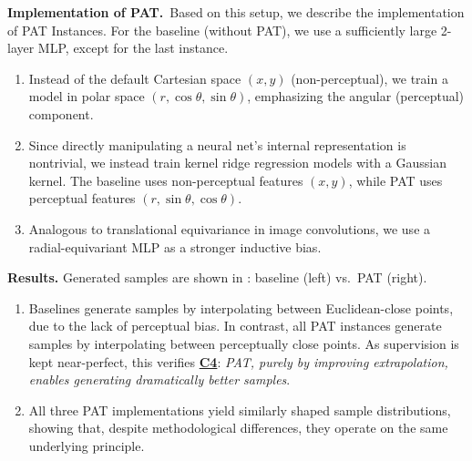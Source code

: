 \textbf{Implementation of PAT.}~Based on this setup, we describe the implementation of PAT Instances. For the baseline (without PAT), we use a sufficiently large 2-layer MLP, except for the last instance.
{\setlength{\parskip}{2pt}
\begin{enumerate}[leftmargin=*,nosep,itemsep=2pt,label=(P\arabic*)]
    \item {} Instead of the default Cartesian space $(x, y)$ (non-perceptual), we train a model in polar space $(r, \cos\theta, \sin\theta)$, emphasizing the angular (perceptual) component.
    \item {} Since directly manipulating a neural net's internal representation is nontrivial, we instead train kernel ridge regression models with a Gaussian kernel. The baseline uses non-perceptual features $(x, y)$, while PAT uses perceptual features $(r, \sin\theta, \cos\theta)$.
    \item {} Analogous to translational equivariance in image convolutions, we use a radial-equivariant MLP as a stronger inductive bias.
\end{enumerate}}

\textbf{Results.} Generated samples are shown in : baseline (left) vs.\ PAT (right).
{\setlength{\parskip}{2pt}
\begin{enumerate}[leftmargin=*,label=(R\arabic*),nosep,itemsep=2pt]
    \item Baselines generate  samples by interpolating between Euclidean-close points, due to the lack of perceptual bias. In contrast, all PAT instances generate  samples by interpolating between perceptually close points. As supervision is kept near-perfect, this verifies \hyperref[claim:good-extrapolation]{\textbf{C4}}: \emph{PAT, purely by improving extrapolation, enables generating dramatically better samples}. 
    \item All three PAT implementations yield similarly shaped sample distributions, showing that, despite methodological differences, they operate on the same underlying principle.
\end{enumerate}}
